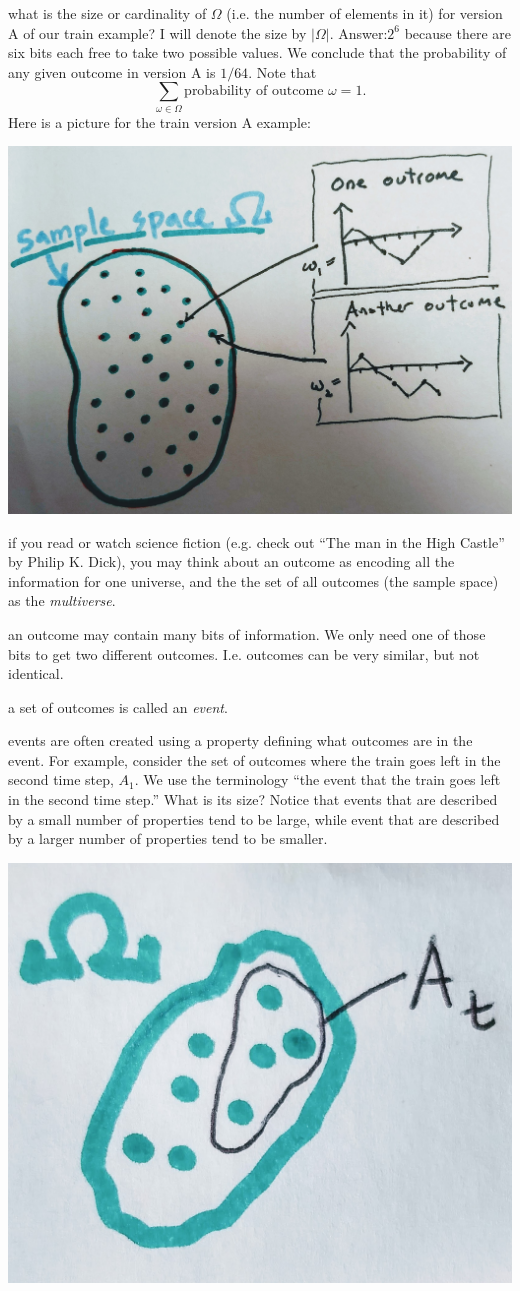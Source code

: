 \documentclass{article}
\begin{document}
 what is the size or cardinality of $\Omega$ (i.e. the number of elements in it) for version A of our train example? I will denote the size by $|\Omega|$. Answer:$2^6$ because there are six bits each free to take two possible values. We conclude that the probability of any given outcome in version A is $1/64$. Note that 
\[ \sum_{\omega \in \Omega} \text{probability of outcome $\omega$} = 1. \]
Here is a picture for the train version A example:
\begin{center}
	\includegraphics[width=0.5\linewidth]{figures/outcomes}
\end{center}

 if you read or watch science fiction (e.g. check out ``The man in the High Castle'' by Philip K. Dick), you may think about an outcome as encoding all the information for one universe, and the the set of all outcomes (the sample space) as the \emph{multiverse}. 

 an outcome may contain many bits of information. We only need one of those bits to get two different outcomes. I.e. outcomes can be very similar, but not identical. 

 a set of outcomes is called an \emph{event}.

 events are often created using a property defining what outcomes are in the event. For example, consider the set of outcomes where the train goes left in the second time step, $A_1$. We use the terminology ``the event that the train goes left in the second time step.''  What is its size? Notice that events that are described by a small number of properties tend to be large, while event that are described by a larger number of properties tend to be smaller. 
\begin{center}
	\includegraphics[width=0.3\linewidth]{figures/event}
\end{center}
\end{document}
